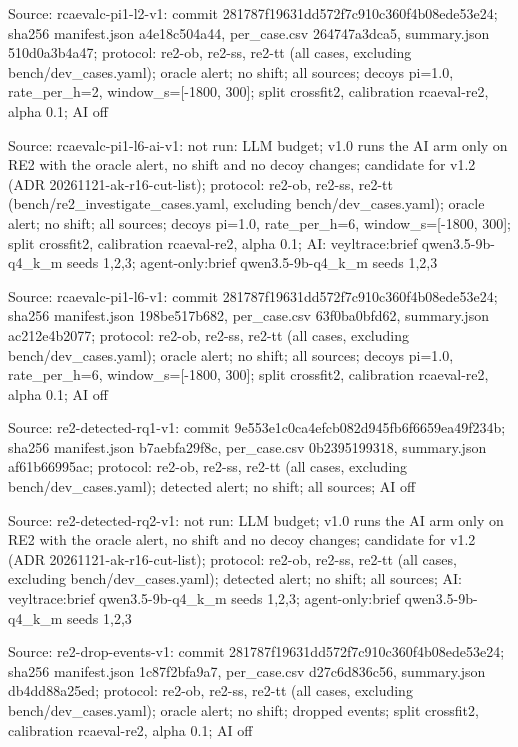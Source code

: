 \noindent Source: rcaevalc-pi1-l2-v1: commit 281787f19631dd572f7c910c360f4b08ede53e24; sha256 manifest.json a4e18c504a44, per\_case.csv 264747a3dca5, summary.json 510d0a3b4a47; protocol: re2-ob, re2-ss, re2-tt (all cases, excluding bench/\allowbreak{}dev\_cases.yaml); oracle alert; no shift; all sources; decoys pi=1.0, rate\_per\_h=2, window\_s=[-1800, 300]; split crossfit2, calibration rcaeval-re2, alpha 0.1; AI off\par
\noindent Source: rcaevalc-pi1-l6-ai-v1: not run: LLM budget; v1.0 runs the AI arm only on RE2 with the oracle alert, no shift and no decoy changes; candidate for v1.2 (ADR 20261121-ak-r16-cut-list); protocol: re2-ob, re2-ss, re2-tt (bench/\allowbreak{}re2\_investigate\_cases.yaml, excluding bench/\allowbreak{}dev\_cases.yaml); oracle alert; no shift; all sources; decoys pi=1.0, rate\_per\_h=6, window\_s=[-1800, 300]; split crossfit2, calibration rcaeval-re2, alpha 0.1; AI: veyltrace:brief qwen3.5-9b-q4\_k\_m seeds 1,2,3; agent-only:brief qwen3.5-9b-q4\_k\_m seeds 1,2,3\par
\noindent Source: rcaevalc-pi1-l6-v1: commit 281787f19631dd572f7c910c360f4b08ede53e24; sha256 manifest.json 198be517b682, per\_case.csv 63f0ba0bfd62, summary.json ac212e4b2077; protocol: re2-ob, re2-ss, re2-tt (all cases, excluding bench/\allowbreak{}dev\_cases.yaml); oracle alert; no shift; all sources; decoys pi=1.0, rate\_per\_h=6, window\_s=[-1800, 300]; split crossfit2, calibration rcaeval-re2, alpha 0.1; AI off\par
\noindent Source: re2-detected-rq1-v1: commit 9e553e1c0ca4efcb082d945fb6f6659ea49f234b; sha256 manifest.json b7aebfa29f8c, per\_case.csv 0b2395199318, summary.json af61b66995ac; protocol: re2-ob, re2-ss, re2-tt (all cases, excluding bench/\allowbreak{}dev\_cases.yaml); detected alert; no shift; all sources; AI off\par
\noindent Source: re2-detected-rq2-v1: not run: LLM budget; v1.0 runs the AI arm only on RE2 with the oracle alert, no shift and no decoy changes; candidate for v1.2 (ADR 20261121-ak-r16-cut-list); protocol: re2-ob, re2-ss, re2-tt (all cases, excluding bench/\allowbreak{}dev\_cases.yaml); detected alert; no shift; all sources; AI: veyltrace:brief qwen3.5-9b-q4\_k\_m seeds 1,2,3; agent-only:brief qwen3.5-9b-q4\_k\_m seeds 1,2,3\par
\noindent Source: re2-drop-events-v1: commit 281787f19631dd572f7c910c360f4b08ede53e24; sha256 manifest.json 1c87f2bfa9a7, per\_case.csv d27c6d836c56, summary.json db4dd88a25ed; protocol: re2-ob, re2-ss, re2-tt (all cases, excluding bench/\allowbreak{}dev\_cases.yaml); oracle alert; no shift; dropped events; split crossfit2, calibration rcaeval-re2, alpha 0.1; AI off\par
